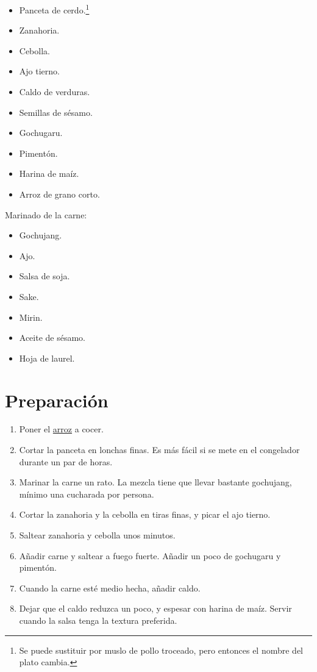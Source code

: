\documentclass[
]{book}
\providecommand{\tightlist}{%
  \setlength{\itemsep}{0pt}\setlength{\parskip}{0pt}}
\begin{document}
\begin{itemize}
\tightlist
\item
  Panceta de cerdo.\footnote{Se puede sustituir por muslo de pollo troceado, pero entonces el nombre del plato cambia.}
\item
  Zanahoria.
\item
  Cebolla.
\item
  Ajo tierno.
\item
  Caldo de verduras.
\item
  Semillas de sésamo.
\item
  Gochugaru.
\item
  Pimentón.
\item
  Harina de maíz.
\item
  Arroz de grano corto.
\end{itemize}

Marinado de la carne:

\begin{itemize}
\tightlist
\item
  Gochujang.
\item
  Ajo.
\item
  Salsa de soja.
\item
  Sake.
\item
  Mirin.
\item
  Aceite de sésamo.
\item
  Hoja de laurel.
\end{itemize}

\hypertarget{preparaciuxf3n-2}{%
\section*{Preparación}\label{preparaciuxf3n-2}}

\begin{enumerate}
\def\labelenumi{\arabic{enumi}.}
\tightlist
\item
  Poner el \url{arroz} a cocer.
\item
  Cortar la panceta en lonchas finas. Es más fácil si se mete en el congelador durante un par de horas.
\item
  Marinar la carne un rato. La mezcla tiene que llevar bastante gochujang, mínimo una cucharada por persona.
\item
  Cortar la zanahoria y la cebolla en tiras finas, y picar el ajo tierno.
\item
  Saltear zanahoria y cebolla unos minutos.
\item
  Añadir carne y saltear a fuego fuerte. Añadir un poco de gochugaru y pimentón.
\item
  Cuando la carne esté medio hecha, añadir caldo.
\item
  Dejar que el caldo reduzca un poco, y espesar con harina de maíz. Servir cuando la salsa tenga la textura preferida.
\end{enumerate}
\end{document}
